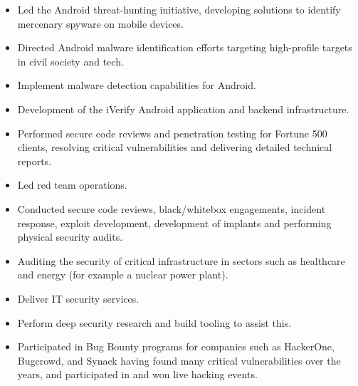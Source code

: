 \documentclass[10pt,a4paper,ragged2e,withhyper]{altacv}
\begin{document}
\begin{paracol}{2}

\begin{itemize}
\item Led the Android threat-hunting initiative, developing solutions to identify mercenary spyware on mobile devices.
\item Directed Android malware identification efforts targeting high-profile targets in civil society and tech.
\item Implement malware detection capabilities for Android.
\item Development of the iVerify Android application and backend infrastructure.
\end{itemize}

\divider

\begin{itemize}
\item Performed secure code reviews and penetration testing for Fortune 500 clients, resolving critical vulnerabilities and delivering detailed technical reports.
\end{itemize}

\divider

\begin{itemize}
\item Led red team operations.
\item Conducted secure code reviews, black/whitebox engagements, incident response, exploit development, development of implants and performing physical security audits.
\item Auditing the security of critical infrastructure in sectors such as healthcare and energy (for example a nuclear power plant).
\end{itemize}

\divider

\begin{itemize}
\item Deliver IT security services.
\item Perform deep security research and build tooling to assist this.
\item Participated in Bug Bounty programs for companies such as HackerOne, Bugcrowd, and Synack having found many critical vulnerabilities over the years, and participated in and won live hacking events.
\end{itemize}


\end{paracol}
\end{document}
